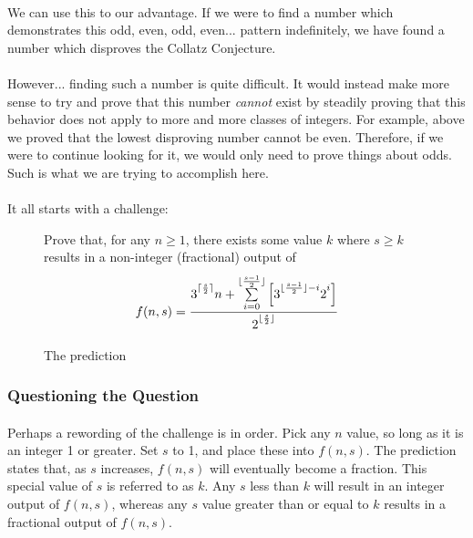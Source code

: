 \documentclass[12pt,letterpaper]{article}
\begin{document}
			\paragraph{} We can use this to our advantage. If we were to find a number which demonstrates this odd, even, odd, even... pattern indefinitely, we have found a number which disproves the Collatz Conjecture.
			
			\paragraph{} However... finding such a number is quite difficult. It would instead make more sense to try and prove that this number \textit{cannot} exist by steadily proving that this behavior does not apply to more and more classes of integers. For example, above we proved that the lowest disproving number cannot be even. Therefore, if we were to continue looking for it, we would only need to prove things about odds. Such is what we are trying to accomplish here.
			
			\paragraph{} It all starts with a challenge:
			
			\begin{figure}[h]
				\centering
				Prove that, for any $n \geqslant 1$, there exists some value $k$ where $s \geqslant k$ results in a non-integer (fractional) output of
				\begin{equation*}
				f(n, s) = \frac{3\strut^{\lceil \frac{s}{2}	\rceil} n + 
					\sum\limits_{i=0}^
					{\lfloor \frac{s-1}{2} \rfloor} 
					\left[
					3\strut^{\lfloor \frac{s-1}{2} \rfloor - i}
					2\strut^i 
					\right]}
				{2\strut^{\lfloor \frac{s}{2} \rfloor}}
				\end{equation*}
				
				\caption{The prediction}
				\label{fig:challenge}
			\end{figure}
			\newpage %
			
		\subsubsection{Questioning the Question}
		
			\paragraph{} Perhaps a rewording of the challenge is in order. Pick any $n$ value, so long as it is an integer 1 or greater. Set $s$ to 1, and place these into $f(n, s)$. The prediction states that, as $s$ increases, $f(n, s)$ will eventually become a fraction. This special value of $s$ is referred to as $k$. Any $s$ less than $k$ will result in an integer output of $f(n, s)$, whereas any $s$ value greater than or equal to $k$ results in a fractional output of $f(n, s)$.
			
\end{document}
